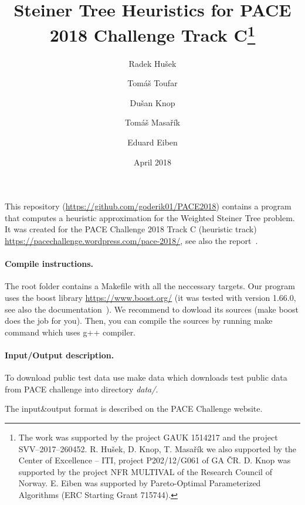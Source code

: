 \documentclass[review,a4paper]{article}
\begin{document}
\title{Steiner Tree Heuristics for PACE 2018 Challenge Track C\thanks{%
    The work was supported by the project GAUK 1514217 and the project SVV–2017–260452. R. Hušek, D. Knop, T. Masařík we also supported by the Center of Excellence – ITI, project P202/12/G061 of GA ČR. D. Knop was supported by the project NFR MULTIVAL of the Research Council of Norway. E. Eiben was supported by Pareto-Optimal Parameterized Algorithms (ERC Starting Grant 715744).
}}
\author[1]{Radek Hušek} 
\author[1]{Tomáš Toufar}
\author[2]{Dušan Knop}
\author[3]{Tomáš Masařík}
\author[2]{Eduard Eiben}




\date{April 2018}

\maketitle

This repository (\url{https://github.com/goderik01/PACE2018}) contains a program that computes a heuristic approximation for the Weighted Steiner Tree problem. It was created for the PACE Challenge 2018 Track C (heuristic track) \url{https://pacechallenge.wordpress.com/pace-2018/}, see also the report~\cite{report}.

\paragraph{Compile instructions.}
The root folder contains a Makefile with all the neccessary targets. Our program uses the boost library \url{https://www.boost.org/} (it was tested with version 1.66.0, see also the documentation~\cite{boost}). We recommend to dowload its sources (\textsf{make boost} does the job for you). Then, you can compile the sources by running \textsf{make} command which uses g++ compiler.

\paragraph{Input/Output description.}
To download public test data use \textsf{make data} which downloads test public data from PACE challenge into directory \emph{data/}.

The input\&output format is described on the PACE Challenge website.
\end{document}
